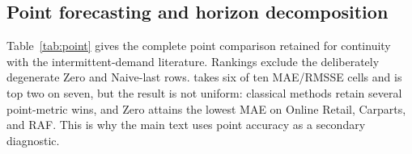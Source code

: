 \subsection{Point forecasting and horizon decomposition}
\label{app:point}

Table~\ref{tab:point} gives the complete point comparison retained for
continuity with the intermittent-demand literature. Rankings exclude the
deliberately degenerate Zero and Naive-last rows. \REMIX{} takes six of
ten MAE/RMSSE cells and is top two on seven, but the result is not uniform:
classical methods retain several point-metric wins, and Zero attains the
lowest MAE on Online Retail, Carparts, and RAF. This is why the main text
uses point accuracy as a secondary diagnostic.


